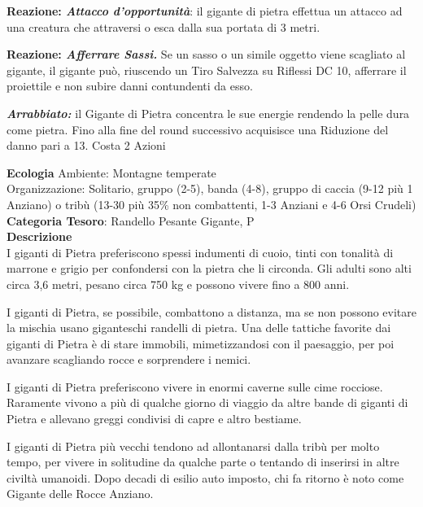 \begin{multicols}{2}
{\textbf{Reazione: \emph{Attacco d'opportunità}}: il gigante di pietra effettua un attacco ad una creatura che attraversi o esca dalla sua portata di 3 metri.

\textbf{Reazione: \emph{Afferrare Sassi.}} Se un sasso o un simile oggetto viene scagliato al gigante, il gigante può, riuscendo un Tiro Salvezza su Riflessi DC 10, afferrare il proiettile e non subire danni contundenti da esso.

\emph{\textbf{Arrabbiato:}} il Gigante di Pietra concentra le sue energie rendendo la pelle dura come pietra. Fino alla fine del round successivo acquisisce una Riduzione del danno pari a 13. Costa 2 Azioni

\textbf{Ecologia}
Ambiente: Montagne temperate\\
Organizzazione: Solitario, gruppo (2-5), banda (4-8), gruppo di caccia (9-12 più 1 Anziano) o tribù (13-30 più 35\% non combattenti, 1-3 Anziani e 4-6 Orsi Crudeli)\\
\textbf{Categoria Tesoro}: Randello Pesante Gigante, P\\
\textbf{Descrizione}\\
I giganti di Pietra preferiscono spessi indumenti di cuoio, tinti con tonalità di marrone e grigio per confondersi con la pietra che li circonda. Gli adulti sono alti circa 3,6 metri, pesano circa 750 kg e possono vivere fino a 800 anni.

I giganti di Pietra, se possibile, combattono a distanza, ma se non possono evitare la mischia usano giganteschi randelli di pietra. Una delle tattiche favorite dai giganti di Pietra è di stare immobili, mimetizzandosi con il paesaggio, per poi avanzare scagliando rocce e sorprendere i nemici.

I giganti di Pietra preferiscono vivere in enormi caverne sulle cime rocciose. Raramente vivono a più di qualche giorno di viaggio da altre bande di giganti di Pietra e allevano greggi condivisi di capre e altro bestiame.

I giganti di Pietra più vecchi tendono ad allontanarsi dalla tribù per molto tempo, per vivere in solitudine da qualche parte o tentando di inserirsi in altre civiltà umanoidi. Dopo decadi di esilio auto imposto, chi fa ritorno è noto come Gigante delle Rocce Anziano.

}
\end{multicols}
